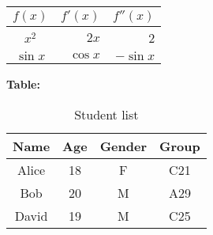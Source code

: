 \documentclass{article}
\begin{document}
\vspace{5mm}

\begin{tabular}{c|rr} %
$f(x)$ &  $f'(x)$  &  $f''(x)$\\[1ex]
\hline
$x^2$ &  $2x$   &  2\\
\hline
$\sin x$ & $\cos x$ & $-\sin x$
\end{tabular}


\vspace{1cm}
\textbf{Table:} \\

\begin{table}[h]  %
\centering %
\begin{tabular}{|c|c|c|c|} %
\hline
Name & Age & Gender & Group \\
\hline
Alice & 18 & F & C21\\
\hline
Bob & 20 & M & A29\\
\hline
David & 19 & M & C25\\
\hline
\end{tabular}
\caption{Student list} %
\end{table}









\end{document}

